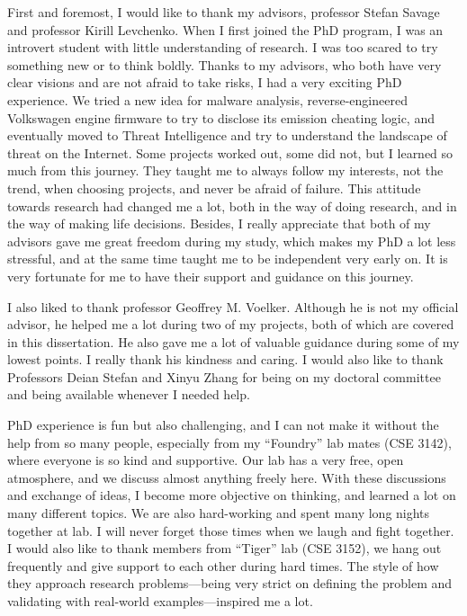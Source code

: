 \begin{acknowledgements}
First and foremost, I would like to thank my advisors, professor Stefan
Savage and professor Kirill Levchenko. When I first joined the PhD program,
I was an introvert student with little understanding of research. I was
too scared to try something new or to think boldly. Thanks to my advisors,
who both have very clear visions and are not afraid to take risks, I had a 
very exciting PhD experience. We tried a new idea for malware analysis, 
reverse-engineered Volkswagen engine firmware to try to disclose its emission 
cheating logic, and eventually moved to Threat Intelligence and try to understand 
the landscape of threat on the Internet. Some projects worked out, some did not, 
but I learned so much from this journey. They taught me to always follow my
interests, not the trend, when choosing projects, and never be afraid of 
failure. This attitude towards research had changed me a lot, both in the
way of doing research, and in the way of making life decisions. Besides, 
I really appreciate that both of my advisors gave me great freedom during
my study, which makes my PhD a lot less stressful, and at the same 
time taught me to be independent very early on. It is very fortunate for me to 
have their support and guidance on this journey.

I also liked to thank professor Geoffrey M. Voelker. Although he is not my
official advisor, he helped me a lot during two of my projects, both of 
which are covered in this dissertation. He also gave me a lot of valuable 
guidance during some of my lowest points. I really thank his kindness
and caring. I would also like to thank Professors Deian Stefan and Xinyu Zhang 
for being on my doctoral committee and being available whenever I needed help.

PhD experience is fun but also challenging, and I can not make it 
without the help from so many people, especially from my ``Foundry'' lab
mates (CSE 3142), where everyone is so kind and supportive.
Our lab has a very free, open atmosphere, and we discuss almost anything
freely here. With these discussions and exchange of ideas, I become 
more objective on thinking, and learned a lot on many different 
topics. We are also hard-working and spent many long nights together
at lab. I will never forget those times when we laugh and fight together. 
I would also like to thank members from ``Tiger'' lab (CSE 3152), we 
hang out frequently and give support to each other during hard times. The style 
of how they approach research problems---being very strict on defining the
problem and validating with real-world examples---inspired me a lot.


\end{acknowledgements}
